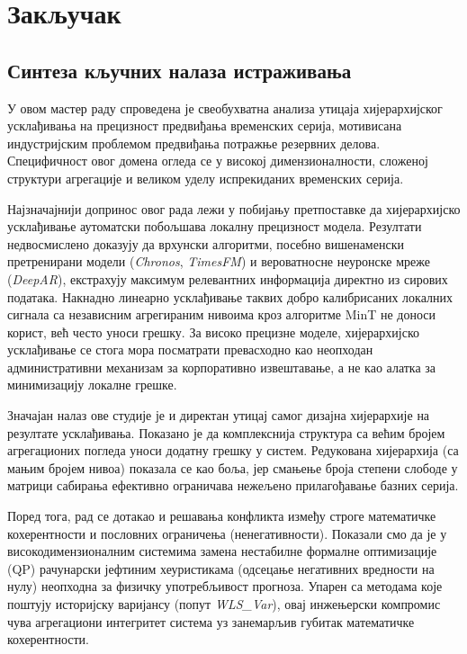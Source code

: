 \documentclass[12pt,oneside]{memoir}
\begin{document}
\chapter{Закључак}
\label{chp:zakljucak}

\section{Синтеза кључних налаза истраживања}

У овом мастер раду спроведена је свеобухватна анализа утицаја хијерархијског усклађивања на прецизност предвиђања временских серија, мотивисана индустријским проблемом предвиђања потражње резервних делова. Специфичност овог домена огледа се у високој димензионалности, сложеној структури агрегације и великом уделу испрекиданих временских серија.

Најзначајнији допринос овог рада лежи у побијању претпоставке да хијерархијско усклађивање аутоматски побољшава локалну прецизност модела. Резултати недвосмислено доказују да врхунски алгоритми, посебно вишенаменски претренирани модели (\textit{Chronos}, \textit{TimesFM}) и вероватносне неуронске мреже (\textit{DeepAR}), екстрахују максимум релевантних информација директно из сирових података. Накнадно линеарно усклађивање таквих добро калибрисаних локалних сигнала са независним агрегираним нивоима кроз алгоритме MinT не доноси корист, већ често уноси грешку. За високо прецизне моделе, хијерархијско усклађивање се стога мора посматрати превасходно као неопходан административни механизам за корпоративно извештавање, а не као алатка за минимизацију локалне грешке.

Значајан налаз ове студије је и директан утицај самог дизајна хијерархије на резултате усклађивања. Показано је да комплекснија структура са већим бројем агрегационих погледа уноси додатну грешку у систем. Редукована хијерархија (са мањим бројем нивоа) показала се као боља, јер смањење броја степени слободе у матрици сабирања ефективно ограничава нежељено прилагођавање базних серија.

Поред тога, рад се дотакао и решавања конфликта између строге математичке кохерентности и пословних ограничења (ненегативности). Показали смо да је у високодимензионалним системима замена нестабилне формалне оптимизације (QP) рачунарски јефтиним хеуристикама (одсецање негативних вредности на нулу) неопходна за физичку употребљивост прогноза. Упарен са методама које поштују историјску варијансу (попут \textit{WLS\_Var}), овај инжењерски компромис чува агрегациони интегритет система уз занемарљив губитак математичке кохерентности.
\end{document}
